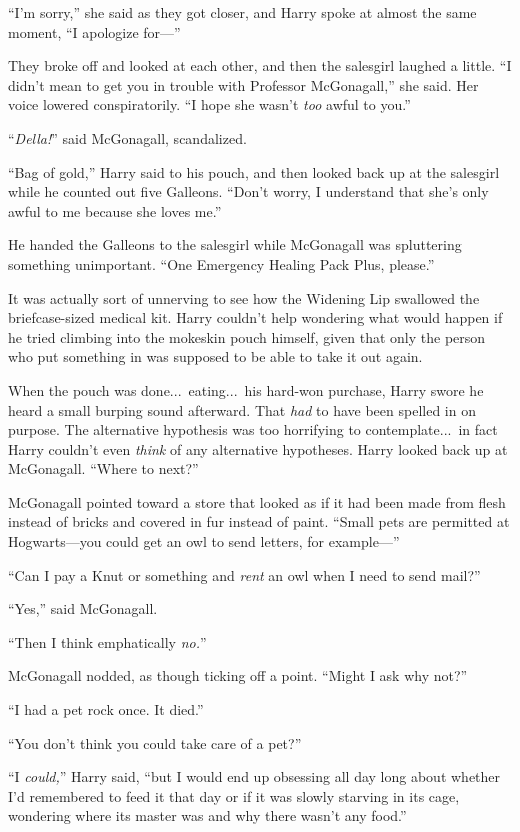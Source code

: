 “I’m sorry,” she said as they got closer, and Harry spoke at almost the same moment, “I apologize for—”

They broke off and looked at each other, and then the salesgirl laughed a little. “I didn’t mean to get you in trouble with Professor McGonagall,” she said. Her voice lowered conspiratorily. “I hope she wasn’t \emph{too} awful to you.”

“\emph{Della!}” said McGonagall, scandalized.

“Bag of gold,” Harry said to his pouch, and then looked back up at the salesgirl while he counted out five Galleons. “Don’t worry, I understand that she’s only awful to me because she loves me.”

He handed the Galleons to the salesgirl while McGonagall was spluttering something unimportant. “One Emergency Healing Pack Plus, please.”

It was actually sort of unnerving to see how the Widening Lip swallowed the briefcase-sized medical kit. Harry couldn’t help wondering what would happen if he tried climbing into the mokeskin pouch himself, given that only the person who put something in was supposed to be able to take it out again.

When the pouch was done...\ eating...\ his hard-won purchase, Harry swore he heard a small burping sound afterward. That \emph{had} to have been spelled in on purpose. The alternative hypothesis was too horrifying to contemplate...\ in fact Harry couldn’t even \emph{think} of any alternative hypotheses. Harry looked back up at McGonagall. “Where to next?”

McGonagall pointed toward a store that looked as if it had been made from flesh instead of bricks and covered in fur instead of paint. “Small pets are permitted at Hogwarts—you could get an owl to send letters, for example—”

“Can I pay a Knut or something and \emph{rent} an owl when I need to send mail?”

“Yes,” said McGonagall.

“Then I think emphatically \emph{no.}”

McGonagall nodded, as though ticking off a point. “Might I ask why not?”

“I had a pet rock once. It died.”

“You don’t think you could take care of a pet?”

“I \emph{could,}” Harry said, “but I would end up obsessing all day long about whether I’d remembered to feed it that day or if it was slowly starving in its cage, wondering where its master was and why there wasn’t any food.”

